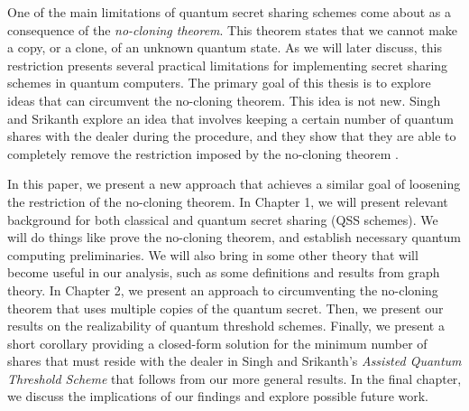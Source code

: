 One of the main limitations of quantum secret sharing schemes come about as a consequence of the \textit{no-cloning theorem}. This theorem states that we cannot make a copy, or a clone, of an unknown quantum state. As we will later discuss, this restriction presents several practical limitations for implementing secret sharing schemes in quantum computers. The primary goal of this thesis is to explore ideas that can circumvent the no-cloning theorem. This idea is not new. Singh and Srikanth explore an idea that involves keeping a certain number of quantum shares with the dealer during the procedure, and they show that they are able to completely remove the restriction imposed by the no-cloning theorem \cite{singh_assisted_2004}.

In this paper, we present a new approach that achieves a similar goal of loosening the restriction of the no-cloning theorem. In Chapter 1, we will present relevant background for both classical and quantum secret sharing (QSS schemes). We will do things like prove the no-cloning theorem, and establish necessary quantum computing preliminaries. We will also bring in some other theory that will become useful in our analysis, such as some definitions and results from graph theory. In Chapter 2, we present an approach to circumventing the no-cloning theorem that uses multiple copies of the quantum secret. Then, we present our results on the realizability of quantum threshold schemes. Finally, we present a short corollary providing a closed-form solution for the minimum number of shares that must reside with the dealer in Singh and Srikanth's \textit{Assisted Quantum Threshold Scheme} that follows from our more general results. In the final chapter, we discuss the implications of our findings and explore possible future work.